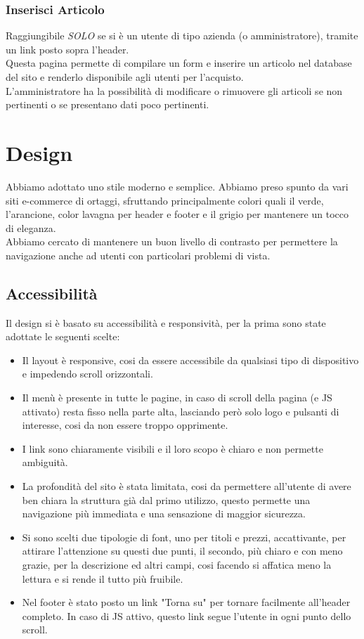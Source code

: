 	\subsubsection{Inserisci Articolo}
	Raggiungibile \textit{SOLO} se si è un utente di tipo azienda (o amministratore), tramite un link posto sopra l'header.\\ Questa pagina permette di compilare un form e inserire un articolo nel database del sito e renderlo disponibile agli utenti per l'acquisto.\\
	L'amministratore ha la possibilità di modificare o rimuovere gli articoli se non pertinenti o se presentano dati poco pertinenti.


\section{Design}
	Abbiamo adottato uno stile moderno e semplice. Abbiamo preso spunto da vari siti e-commerce di ortaggi, sfruttando principalmente colori quali il verde, l'arancione, color lavagna per header e footer e il grigio per mantenere un tocco di eleganza.\\ Abbiamo cercato di mantenere un buon livello di contrasto per permettere la navigazione anche ad utenti con particolari problemi di vista.

\subsection{Accessibilità}
Il design si è basato su accessibilità e responsività, per la prima sono state adottate le seguenti scelte:
\begin{itemize}
	\item Il layout è responsive, cosi da essere accessibile da qualsiasi tipo di dispositivo e impedendo scroll orizzontali.
	\item Il menù è presente in tutte le pagine, in caso di scroll della pagina (e JS attivato) resta fisso nella parte alta, lasciando però solo logo e pulsanti di interesse, cosi da non essere troppo opprimente.
	\item I link sono chiaramente visibili e il loro scopo è chiaro e non permette ambiguità.
	\item La profondità del sito è stata limitata, cosi da permettere all'utente di avere ben chiara la struttura già dal primo utilizzo, questo permette una navigazione più immediata e una sensazione di maggior sicurezza.
	\item Si sono scelti due tipologie di font, uno per titoli e prezzi, accattivante, per attirare l'attenzione su questi due punti, il secondo, più chiaro e con meno grazie, per la descrizione ed altri campi, cosi facendo si affatica meno la lettura e si rende il tutto più fruibile.
	\item Nel footer è stato posto un link "Torna su" per tornare facilmente all'header completo. In caso di JS attivo, questo link segue l'utente in ogni punto dello scroll. 
\end{itemize}
